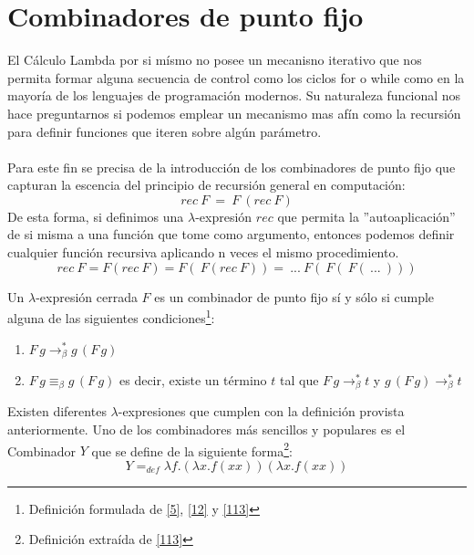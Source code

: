         \section{Combinadores de punto fijo}
                    El Cálculo Lambda por si mísmo no posee un mecanisno iterativo que nos permita formar alguna secuencia de control como los ciclos \textsf{for} o \textsf{while} como en la mayoría de los lenguajes de programación modernos. Su naturaleza funcional nos hace preguntarnos si podemos emplear un mecanismo mas afín como la recursión para definir funciones que iteren sobre algún parámetro.\\\\
                   Para este fin se precisa de la introducción de los combinadores de punto fijo que capturan la escencia del principio de recursión general en computación:
                    $$ rec\ F\ =\ F\ (rec\ F) $$
                    De esta forma, si definimos una $\lambda$-expresión $rec$ que permita la ''autoaplicación'' de si misma a una función que tome como argumento, entonces podemos definir cualquier función recursiva aplicando n veces el mismo procedimiento.
                    $$rec\ F = F(rec\ F) = F(\ F(rec\ F)) =\ ...\ F(\ F(\ F(\ ...\ )))$$
                    
                    \begin{definition} Un $\lambda$-expresión cerrada $F$ es un combinador de punto fijo sí y sólo si cumple alguna de las siguientes condiciones\footnote{Definición formulada de \hyperlink{5}{[5]}, \hyperlink{12}{[12]} y \hyperlink{113}{[113]}}:
                        \begin{enumerate}
                            \item $F\,g\to_\beta^*g\,(F\,g)$
                            \item $F\,g\equiv_\beta g\,(F\,g)$ es decir, existe un término $t$ tal que $F\,g\to_\beta^*t$ y $g\,(F\,g)\to_\beta^*t$
                        \end{enumerate}
                    \end{definition}

              
                    \begin{definition}[Combinador $Y$] Existen diferentes $\lambda$-expresiones que cumplen con la definición provista anteriormente. Uno de los combinadores más sencillos y populares es el Combinador $Y$ que se define de la siguiente forma\footnote{Definición extraída de \hyperlink{113}{[113]}}:
                        $$Y =_{def} \lambda f.(\lambda x.f(xx))(\lambda x.f(xx))$$
                    \end{definition}
    
